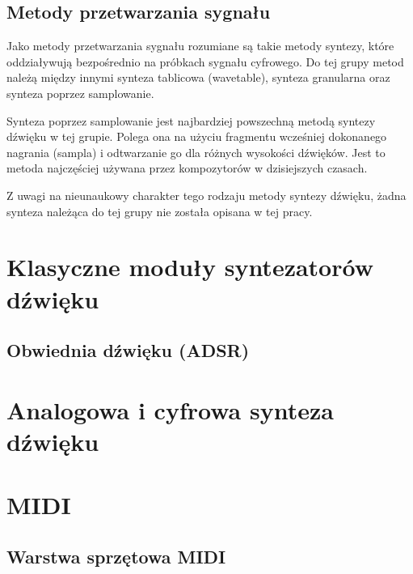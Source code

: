 \subsection{Metody przetwarzania sygnału}
Jako metody przetwarzania sygnału rozumiane są takie metody syntezy, które oddziaływują bezpośrednio na próbkach sygnału cyfrowego. Do tej grupy metod należą między innymi synteza tablicowa (wavetable), synteza granularna oraz synteza poprzez samplowanie.

Synteza poprzez samplowanie jest najbardziej powszechną metodą syntezy dźwięku w tej grupie. Polega ona na użyciu fragmentu wcześniej dokonanego nagrania (sampla) i odtwarzanie go dla różnych wysokości dźwięków. Jest to metoda najczęściej używana przez kompozytorów w dzisiejszych czasach.

Z uwagi na nieunaukowy charakter tego rodzaju metody syntezy dźwięku, żadna synteza należąca do tej grupy nie została opisana w tej pracy.



\section{Klasyczne moduły syntezatorów dźwięku}
\subsection{Obwiednia dźwięku (ADSR)}




\section{Analogowa i cyfrowa synteza dźwięku}




\section{MIDI}


\subsection{Warstwa sprzętowa MIDI}

